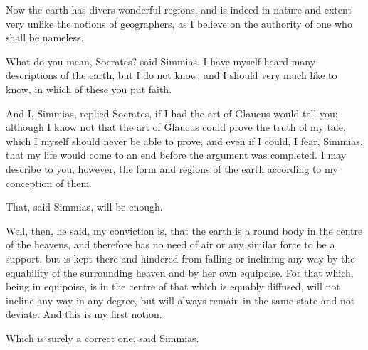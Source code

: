 Now the earth has divers wonderful regions, and is indeed in nature
and extent very unlike the notions of geographers, as I believe on the
authority of one who shall be nameless.

What do you mean, Socrates? said Simmias. I have myself heard many
descriptions of the earth, but I do not know, and I should very much
like to know, in which of these you put faith.

And I, Simmias, replied Socrates, if I had the art of Glaucus would tell
you; although I know not that the art of Glaucus could prove the truth
of my tale, which I myself should never be able to prove, and even if
I could, I fear, Simmias, that my life would come to an end before the
argument was completed. I may describe to you, however, the form and
regions of the earth according to my conception of them.

That, said Simmias, will be enough.

Well, then, he said, my conviction is, that the earth is a round body
in the centre of the heavens, and therefore has no need of air or any
similar force to be a support, but is kept there and hindered from
falling or inclining any way by the equability of the surrounding heaven
and by her own equipoise. For that which, being in equipoise, is in the
centre of that which is equably diffused, will not incline any way in
any degree, but will always remain in the same state and not deviate.
And this is my first notion.

Which is surely a correct one, said Simmias.

